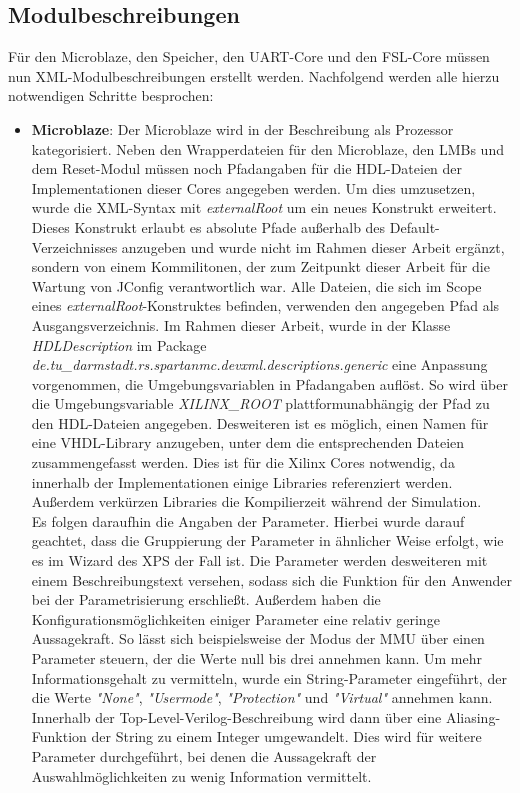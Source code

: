 \subsection{Modulbeschreibungen}
Für den Microblaze, den Speicher, den UART-Core und den FSL-Core müssen nun XML-Modulbeschreibungen erstellt werden. Nachfolgend werden alle hierzu notwendigen Schritte besprochen:
\begin{itemize}
\item \textbf{Microblaze}: Der Microblaze wird in der Beschreibung als Prozessor kategorisiert. Neben den Wrapperdateien für den Microblaze, den LMBs und dem Reset-Modul müssen noch Pfadangaben für die HDL-Dateien der Implementationen dieser Cores angegeben werden. Um dies umzusetzen, wurde die XML-Syntax mit \textit{externalRoot} um ein neues Konstrukt erweitert. Dieses Konstrukt erlaubt es absolute Pfade außerhalb des Default-Verzeichnisses anzugeben und wurde nicht im Rahmen dieser Arbeit ergänzt, sondern von einem Kommilitonen, der zum Zeitpunkt dieser Arbeit für die Wartung von JConfig verantwortlich war. Alle Dateien, die sich im Scope eines \textit{externalRoot}-Konstruktes befinden, verwenden den angegeben Pfad als Ausgangsverzeichnis. Im Rahmen dieser Arbeit, wurde in der Klasse \textit{HDLDescription} im Package \textit{de.tu\_darmstadt.rs.spartanmc.devxml.descriptions.generic} eine Anpassung vorgenommen, die Umgebungsvariablen in Pfadangaben auflöst. So wird über die Umgebungsvariable \textit{XILINX\_ROOT} plattformunabhängig der Pfad zu den HDL-Dateien angegeben. Desweiteren ist es möglich, einen Namen für eine VHDL-Library anzugeben, unter dem die entsprechenden Dateien zusammengefasst werden. Dies ist für die Xilinx Cores notwendig, da innerhalb der Implementationen einige Libraries referenziert werden. Außerdem verkürzen Libraries die Kompilierzeit während der Simulation.\\
Es folgen daraufhin die Angaben der Parameter. Hierbei wurde darauf geachtet, dass die Gruppierung der Parameter in ähnlicher Weise erfolgt, wie es im Wizard des XPS der Fall ist. Die Parameter werden desweiteren mit einem Beschreibungstext versehen, sodass sich die Funktion für den Anwender bei der Parametrisierung erschließt. Außerdem haben die Konfigurationsmöglichkeiten einiger Parameter eine relativ geringe Aussagekraft. So lässt sich beispielsweise der Modus der MMU über einen Parameter steuern, der die Werte null bis drei annehmen kann. Um mehr Informationsgehalt zu vermitteln, wurde ein String-Parameter eingeführt, der die Werte \textit{"None"}, \textit{"Usermode"}, \textit{"Protection"} und \textit{"Virtual"} annehmen kann. Innerhalb der Top-Level-Verilog-Beschreibung wird dann über eine Aliasing-Funktion der String zu einem Integer umgewandelt. Dies wird für weitere Parameter durchgeführt, bei denen die Aussagekraft der Auswahlmöglichkeiten zu wenig Information vermittelt.\\

\end{itemize}

